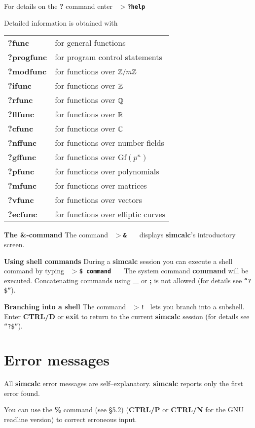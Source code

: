 For details on the {\bf ?} command enter
\leer
{\tt
  {\bf $>$?help}\ \ \care
}


Detailed information is obtained with
\leer
\begin{tabular}{p{1in}p{4.16in}}
{\bf ?func}     & for general functions\\
{\bf ?progfunc} & for program control statements\\
{\bf ?modfunc}  & for functions over $\mbox{$\mathbb Z$} /m\mbox{$\mathbb Z$} $\\
{\bf ?ifunc}    & for functions over $\mbox{$\mathbb Z$}$\\
{\bf ?rfunc}    & for functions over $\mbox{$\mathbb Q$}$\\
{\bf ?flfunc}   & for functions over $\mbox{$\mathbb R$}$\\
{\bf ?cfunc}    & for functions over $\mbox{$\mathbb C$}$\\
{\bf ?nffunc}   & for functions over number fields\\
{\bf ?gffunc}   & for functions over Gf$(p^n)$\\
{\bf ?pfunc}    & for functions over polynomials\\
{\bf ?mfunc}    & for functions over matrices\\
{\bf ?vfunc}    & for functions over vectors\\
{\bf ?ecfunc}   & for functions over elliptic curves
\end{tabular}

\newpage

\leer\leer
{\bf The \&-command}
\leer
The command
\leer
{\tt
  {\bf $>$\&}\ \ \care
}
\leer
displays {\bf simcalc}'s introductory screen.

\leer\leer
{\bf Using shell commands}
\leer
During a {\bf simcalc} session you can execute a shell command by typing
\leer
{\tt
  {\bf $>$\$ command}\ \ \care
}
\leer
The system command {\bf command} will be executed. Concatenating commands using {\bf \_}
or {\bf ;} is not allowed (for details see {\tt ``?\$''}).

\leer\leer
{\bf  Branching into a shell}
\leer
The command
\leer
{\tt
  {\bf $>$!} \care
}
\leer
lets you branch into a subshell. Enter {\bf CTRL/D} or {\bf exit} to return to the current
{\bf simcalc} session (for details see {\tt ``?\$''}).



\section{Error messages}
All {\bf simcalc} error messages are self--explanatory. {\bf simcalc} reports only the first
error found.

You can use the {\bf \%} command (see \S 5.2) ({\bf CTRL/P} or {\bf CTRL/N} for the GNU
readline version) to correct erroneous input.
%
